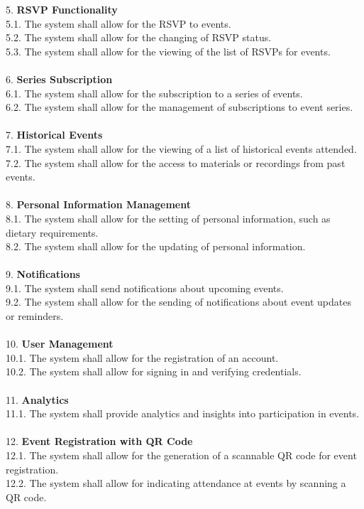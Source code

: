 \documentclass[a4paper,12pt]{article}
\begin{document}
5. \textbf{RSVP Functionality}\\
    5.1. The system shall allow for the RSVP to events.\\
    5.2. The system shall allow for the changing of RSVP status.\\
    5.3. The system shall allow for the viewing of the list of RSVPs for events.\\\\
6. \textbf{Series Subscription}\\
    6.1. The system shall allow for the subscription to a series of events.\\
    6.2. The system shall allow for the management of subscriptions to event series.\\\\
7. \textbf{Historical Events}\\
    7.1. The system shall allow for the viewing of a list of historical events attended.\\
    7.2. The system shall allow for the access to materials or recordings from past events.\\\\
8. \textbf{Personal Information Management}\\
    8.1. The system shall allow for the setting of personal information, such as dietary requirements.\\
    8.2. The system shall allow for the updating of personal information.\\\\
9. \textbf{Notifications}\\
    9.1. The system shall send notifications about upcoming events.\\
    9.2. The system shall allow for the sending of notifications about event updates or reminders.\\\\
10. \textbf{User Management}\\
    10.1. The system shall allow for the registration of an account.\\
    10.2. The system shall allow for signing in and verifying credentials.\\\\
11. \textbf{Analytics}\\
    11.1. The system shall provide analytics and insights into participation in events.\\\\
12. \textbf{Event Registration with QR Code}\\
    12.1. The system shall allow for the generation of a scannable QR code for event registration.\\
    12.2. The system shall allow for indicating attendance at events by scanning a QR code.\\
\end{document}
